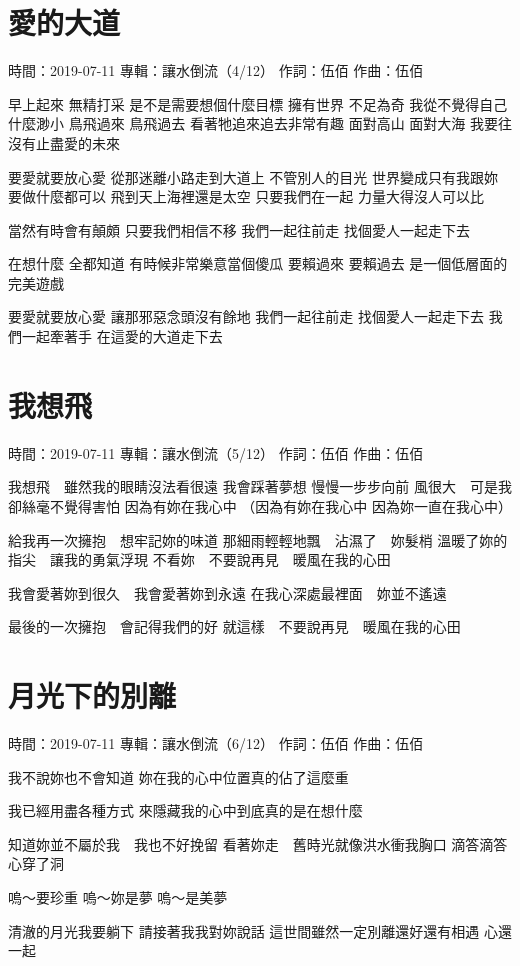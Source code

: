 \documentclass[UTF8,a4paper,oneside,twocolumn,12pt]{ctexbook}
\newcommand{\infopair}[2]{\textbullet #1：#2}
\newcommand{\zc}[1][伍佰]{\infopair{作詞}{#1}}
\newcommand{\zq}[1][伍佰]{\infopair{作曲}{#1}}
\newcommand{\zj}[1]{\infopair{專輯}{#1}}
\newcommand{\sj}[1]{\infopair{時間}{#1}}
\newenvironment{info}{\begin{flushleft}\kaishu
	}
	{\end{flushleft}\normalsize\yahei\par}
\newenvironment{lyric}{
	}
{}
\begin{document}
\section{愛的大道}
\begin{info}
	\sj{2019-07-11}
	\zj{讓水倒流（4/12）}
	\zc
	\zq
\end{info}
\begin{lyric}
	早上起來 無精打采
	是不是需要想個什麼目標
	擁有世界 不足為奇
	我從不覺得自己什麼渺小
	鳥飛過來 鳥飛過去
	看著牠追來追去非常有趣
	面對高山 面對大海
	我要往沒有止盡愛的未來

	要愛就要放心愛
	從那迷離小路走到大道上
	不管別人的目光
	世界變成只有我跟妳
	要做什麼都可以
	飛到天上海裡還是太空
	只要我們在一起
	力量大得沒人可以比

	當然有時會有顛頗
	只要我們相信不移
	我們一起往前走
	找個愛人一起走下去

	在想什麼 全都知道
	有時候非常樂意當個傻瓜
	要賴過來 要賴過去
	是一個低層面的完美遊戲

	要愛就要放心愛
	讓那邪惡念頭沒有餘地
	我們一起往前走
	找個愛人一起走下去
	我們一起牽著手
	在這愛的大道走下去
\end{lyric}

\section{我想飛}
\begin{info}
	\sj{2019-07-11}
	\zj{讓水倒流（5/12）}
	\zc
	\zq
\end{info}
\begin{lyric}
	我想飛　雖然我的眼睛沒法看很遠
	我會踩著夢想
	慢慢一步步向前
	風很大　可是我卻絲毫不覺得害怕
	因為有妳在我心中
	（因為有妳在我心中 因為妳一直在我心中）

	給我再一次擁抱　想牢記妳的味道
	那細雨輕輕地飄　沾濕了　妳髮梢
	溫暖了妳的指尖　讓我的勇氣浮現
	不看妳　不要說再見　暖風在我的心田

	我會愛著妳到很久　我會愛著妳到永遠
	在我心深處最裡面　妳並不遙遠

	最後的一次擁抱　會記得我們的好
	就這樣　不要說再見　暖風在我的心田
\end{lyric}

\section{月光下的別離}
\begin{info}
	\sj{2019-07-11}
	\zj{讓水倒流（6/12）}
	\zc
	\zq
\end{info}
\begin{lyric}
	我不說妳也不會知道
	妳在我的心中位置真的佔了這麼重

	我已經用盡各種方式
	來隱藏我的心中到底真的是在想什麼

	知道妳並不屬於我　我也不好挽留
	看著妳走　舊時光就像洪水衝我胸口
	滴答滴答心穿了洞

	嗚～要珍重
	嗚～妳是夢
	嗚～是美夢

	清澈的月光我要躺下
	請接著我我對妳說話
	這世間雖然一定別離還好還有相遇
	心還一起
\end{lyric}
\end{document}
